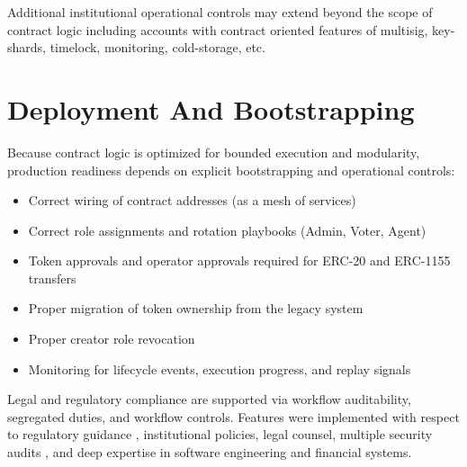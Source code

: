 \documentclass[10pt]{article}
\begin{document}
Additional institutional operational controls may extend beyond the scope of contract logic including
accounts with contract oriented features of multisig, key-shards, timelock, monitoring, cold-storage, etc.

\clearpage

\section{Deployment And Bootstrapping}
Because contract logic is optimized for bounded execution and modularity, production readiness depends
on explicit bootstrapping and operational controls:

\begin{itemize}
    \item Correct wiring of contract addresses (as a mesh of services)
    \item Correct role assignments and rotation playbooks (Admin, Voter, Agent)
    \item Token approvals and operator approvals required for ERC-20 and ERC-1155 transfers
    \item Proper migration of token ownership from the legacy system
    \item Proper creator role revocation
    \item Monitoring for lifecycle events, execution progress, and replay signals
\end{itemize}

\begin{GsNoteHigh}
    Legal and regulatory compliance are supported via workflow auditability, segregated duties, and
    workflow controls. Features were implemented with respect to regulatory guidance \cite{finra_funding_portals} \cite{finra_brokercheck_328312_firm_report} \cite{finra_brokercheck_328312_crs}, institutional
    policies, legal counsel, multiple security audits \cite{runtime_verification_audit} \cite{certik_audit_service}, and deep expertise in software engineering and financial systems.
\end{GsNoteHigh}

\end{document}
